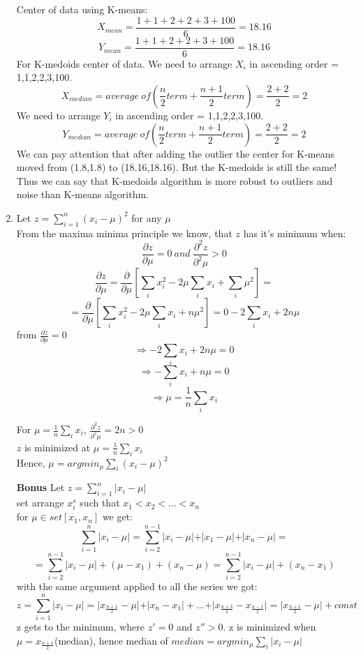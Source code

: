 \documentclass[12pt,a4paper]{article}
\begin{document}
\begin{enumerate}[label=(\alph*)]
Center of data using K-means:\\
$$
\displaystyle X_{mean} = \frac{1+1+2+2+3+100}{6} = 18.16 
$$
$$
\displaystyle Y_{mean} = \frac{1+1+2+2+3+100}{6} = 18.16  
$$
For K-medoids center of data. We need to arrange $X_i$ in ascending order = 1,1,2,2,3,100.\\
$$
\displaystyle X_{median} = average~ of (\frac{n}{2}term+\frac{n+1}{2}term) = \frac{2+2}{2}=2
$$ 
We need to arrange $Y_i$ in ascending order = 1,1,2,2,3,100.\\
$$
\displaystyle Y_{median} = average~ of (\frac{n}{2}term+\frac{n+1}{2}term) = \frac{2+2}{2}=2
$$ 
We can pay attention that after adding the outlier the center for K-means moved from (1.8,1.8) to (18.16,18.16). But the K-medoids is still the same! Thus we can say that K-medoids algorithm is more  robust to outliers and noise than K-means algorithm.

\item Let $z = \sum_{i=1}^{n}\left(x_i - \mu \right)^2  $ for any $\mu$\\
From the maxima minima principle we know, that $z$ has it's minimum when:
$$
\displaystyle \frac{\partial z}{\partial \mu} = 0 ~ and ~ \frac{\partial^2 z}{\partial^2 \mu} > 0
$$$$
\displaystyle \frac{\partial z}{\partial \mu} = \frac{\partial}{\partial \mu}\left[ \sum_i x_i^2 - 2\mu \sum_i x_i + \sum_i \mu^2 \right] = 
$$$$
\displaystyle =  \frac{\partial}{\partial \mu}\left[ \sum_i x_i^2 - 2\mu \sum_i x_i + n \mu^2 \right] = 0 - 2\sum_i x_i +2n\mu
$$
from $\frac{\partial z}{\partial \mu} = 0$
$$
\displaystyle \Longrightarrow  -2\sum_i x_i +2n\mu = 0
$$
$$
\displaystyle \Longrightarrow  -\sum_i x_i +n\mu = 0
$$
$$
\displaystyle \Longrightarrow  \mu =\frac{1}{n} \sum_i x_i 
$$

For $\mu =\frac{1}{n} \sum_i x_i $, $\frac{\partial^2 z}{\partial^2 \mu} = 2n > 0$\\[5pt]
$z$ is minimized at $\mu =\frac{1}{n} \sum_i x_i $\\[5pt]
Hence, $\mu =argmin_\mu\sum_i \left(x_i -\mu \right)^2$



\item[\textbf{Bonus}] Let $z = \sum_{i=1}^{n}\vert x_i - \mu \vert$\\[5pt]
set arrange $x_i^s$ such that $x_1<x_2<\dots<x_n$\\[5pt]
for $\mu \in set[x_1,x_n]$ we get:
$$
\displaystyle \sum_{i=1}^{n}\vert x_i - \mu \vert = \sum_{i=2}^{n-1}\vert x_i - \mu \vert + \vert x_1 - \mu \vert + \vert x_n - \mu \vert = 
$$$$
\displaystyle = \sum_{i=2}^{n-1}\vert x_i - \mu \vert + (\mu - x_1) + (x_n - \mu) = \sum_{i=2}^{n-1}\vert x_i - \mu \vert + (x_n - x_1)
$$
with the same argument applied to all the series we got:
$$
\displaystyle z = \sum_{i=1}^{n}\vert x_i - \mu \vert = \vert x_{\frac{n+1}{2}} - \mu \vert + \vert x_n - x_1 \vert + \dots + \vert x_{\frac{n+3}{2}} - x_{\frac{n-1}{2}} \vert= \vert  x_{\frac{n+1}{2}} - \mu \vert + const
$$
z gets to the minimum, where $z'=0$ and $z''>0$.  z is minimized when $\mu = x_{\frac{n+1}{2}}$(median), hence median of $median = argmin_{\mu}\sum_i \vert x_i - \mu \vert$
\end{enumerate}
\end{document}
